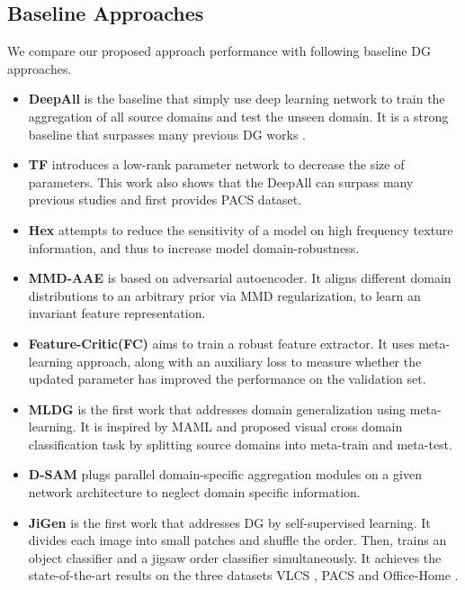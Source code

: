 \documentclass[twocolumn,preprint]{elsarticle}
\begin{document}
\subsection{Baseline Approaches} \label{sub:competitor}
We compare our proposed approach performance with following baseline DG approaches. 
\begin{itemize}
    \item \textbf{DeepAll} is the baseline that simply use deep learning network to train the aggregation of all source domains and test the unseen domain. It is a strong baseline that surpasses many previous DG works \cite{tf}. 
    \item \textbf{TF} \cite{tf} introduces a low-rank parameter network to decrease the size of parameters. This work also shows that the DeepAll can surpass many previous studies and first provides PACS dataset.
    \item \textbf{Hex} \cite{hex} attempts to reduce the sensitivity of a model on high frequency texture information, and thus to increase model domain-robustness. 
    \item \textbf{MMD-AAE} \cite{mmd-aae} is based on adversarial autoencoder. It aligns different domain distributions to an arbitrary prior via MMD regularization, to learn an invariant feature representation.
    \item \textbf{Feature-Critic(FC)} \cite{feature-critic} aims to train a robust feature extractor. It uses meta-learning approach, along with an auxiliary loss to measure whether the updated parameter has improved the performance on the validation set. 
    \item \textbf{MLDG} \cite{mldg} is the first work that addresses domain generalization using meta-learning. It is inspired by MAML \cite{maml} and proposed visual cross domain classification task by splitting source domains into meta-train and meta-test. 
    \item \textbf{D-SAM} \cite{dsam} plugs parallel domain-specific aggregation modules on a given network architecture to neglect domain specific information.  
    \item \textbf{JiGen} \cite{jigsaw} is the first work that addresses DG by self-supervised learning. It divides each image into small patches and shuffle the order. Then, trains an object classifier and a jigsaw order classifier simultaneously. It achieves the state-of-the-art results on the three datasets VLCS \cite{VLCS}, PACS \cite{tf} and Office-Home \cite{office-home}. 
\end{itemize}
\end{document}
